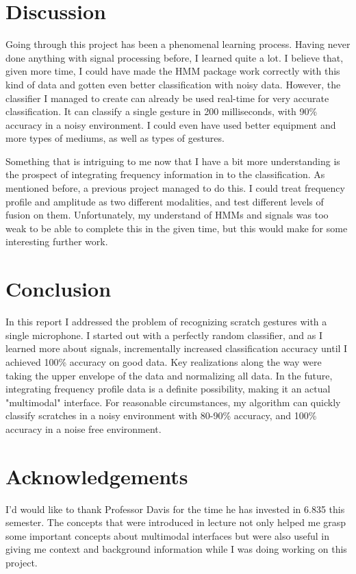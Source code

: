 \documentclass[12pt]{article}
\begin{document}
\FloatBarrier
\section{Discussion}

Going through this project has been a phenomenal learning process. Having never done anything with signal processing before, I learned quite a lot. I believe that, given more time, I could have made the HMM package work correctly with this kind of data and gotten even better classification with noisy data. However, the classifier I managed to create can already be used real-time for very accurate classification. It can classify a single gesture in 200 milliseconds, with 90\% accuracy in a noisy environment. I could even have used better equipment and more types of mediums, as well as types of gestures.

Something that is intriguing to me now that I have a bit more understanding is the prospect of integrating frequency information in to the classification. As mentioned before, a previous project managed to do this. I could treat frequency profile and amplitude as two different modalities, and test different levels of fusion on them. Unfortunately, my understand of HMMs and signals was too weak to be able to complete this in the given time, but this would make for some interesting further work.

\section{Conclusion}

In this report I addressed the problem of recognizing scratch gestures with a single microphone. I started out with a perfectly random classifier, and as I learned more about signals, incrementally increased classification accuracy until I achieved 100\% accuracy on good data. Key realizations along the way were taking the upper envelope of the data and normalizing all data. In the future, integrating frequency profile data is a definite possibility, making it an actual "multimodal" interface. For reasonable circumstances, my algorithm can quickly classify scratches in a noisy environment with 80-90\% accuracy, and 100\% accuracy in a noise free environment.

\section{Acknowledgements}

I'd would like to thank Professor Davis for the time he has invested in 6.835 this semester. The concepts that were introduced in lecture not only helped me grasp some important concepts about multimodal interfaces but were also useful in giving me context and background information while I was doing working on this project.
\end{document}
